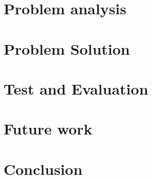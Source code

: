 %
%
%
%
% 


\pagestyle{empty} %



\cleardoublepage
{}
\pagestyle{fancy} %
\setcounter{tocdepth}{1}
\tableofcontents
\listoftodos

\cleardoublepage

\chapter{Problem analysis}






\clearpage

\chapter{Problem Solution}










\chapter{Test and Evaluation}


\chapter{Future work}\label{ch:future-work}

\chapter{Conclusion}

\printbibliography[heading=bibintoc]
\label{bib:mybiblio}
\appendix
%



